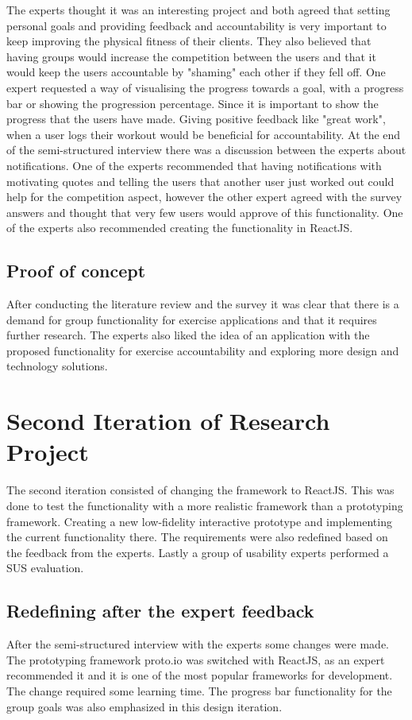 The experts thought it was an interesting project and both agreed that setting personal goals and providing feedback and accountability is very important to keep improving the physical fitness of their clients. They also believed that having groups would increase the competition between the users and that it would keep the users accountable by "shaming" each other if they fell off.
One expert requested a way of visualising the progress towards a goal, with a progress bar or showing the progression percentage. Since it is important to show the progress that the users have made. Giving positive feedback like "great work", when a user logs their workout would be beneficial for accountability. At the end of the semi-structured interview there was a discussion between the experts about notifications. One of the experts recommended that having notifications with motivating quotes and telling the users that another user just worked out could help for the competition aspect, however the other expert agreed with the survey answers and thought that very few users would approve of this functionality. One of the experts also recommended creating the functionality in ReactJS.

\subsection{Proof of concept}
After conducting the literature review and the survey it was clear that there is a demand for group functionality for exercise applications and that it requires further research. The experts also liked the idea of an application with the proposed functionality for exercise accountability and exploring more design and technology solutions.

\section{Second Iteration of Research Project}
The second iteration consisted of changing the framework to ReactJS. This was done to test the functionality with a more realistic framework than a prototyping framework. Creating a new low-fidelity interactive prototype and implementing the current functionality there. The requirements were also redefined based on the feedback from the experts. Lastly a group of usability experts performed a SUS evaluation.
\subsection{Redefining after the expert feedback }
After the semi-structured interview with the experts some changes were made. The prototyping framework proto.io was switched with ReactJS, as an expert recommended it and it is one of the most popular frameworks for development.  The change required some learning time. 
The progress bar functionality for the group goals was also emphasized in this design iteration.

